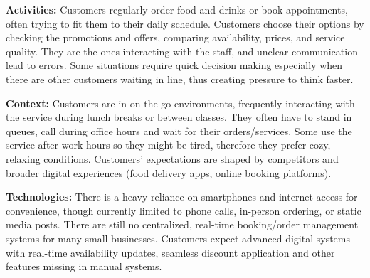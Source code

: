 \documentclass[]{VUMIFTemplateClass}
\begin{document}
\textbf{Activities:} Customers regularly order food and drinks or book appointments, often trying to fit them to their daily schedule. Customers choose their options by checking the promotions and offers, comparing availability, prices, and service quality. They are the ones interacting with the staff, and unclear communication lead to errors. Some situations require quick decision making especially when there are other customers waiting in line, thus creating pressure to think faster.

\textbf{Context:} Customers are in on-the-go environments, frequently interacting with the service during lunch breaks or between classes. They often have to stand in queues, call during office hours and wait for their orders/services. Some use the service after work hours so they might be tired, therefore they prefer cozy, relaxing conditions. Customers' expectations are shaped by competitors and broader digital experiences (food delivery apps, online booking platforms).

\textbf{Technologies:} There is a heavy reliance on smartphones and internet
access for convenience, though currently limited to phone calls, in-person
ordering, or static media posts. There are still no centralized, real-time
booking/order management systems for many small businesses. Customers expect
advanced digital systems with real-time availability updates, seamless discount
application and other features missing in manual systems.
\end{document}
